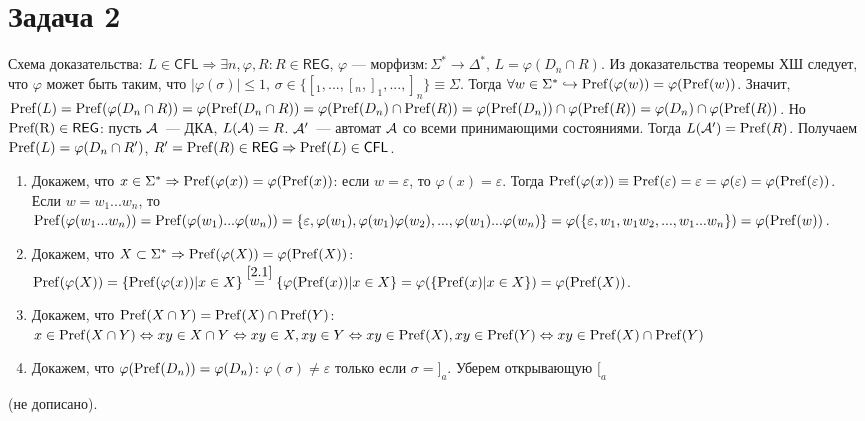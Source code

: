 \documentclass[a4paper]{article}
\def\A{{\cal A}}
\def\REG{{\mathsf{REG}}}
\def\CFL{{\mathsf{CFL}}}
\begin{document}
\section*{Задача 2}
Схема доказательства:\newline
$L\in\CFL\Rightarrow\exists n,\varphi,R\colon R\in\REG,\,\varphi\mbox{~--- морфизм}\colon \Sigma^*\longrightarrow\Delta^*,\,L=\varphi(D_n\cap R)$. Из доказательства теоремы ХШ следует, что $\varphi$ может быть таким, что $|\varphi(\sigma)|\leqslant 1,\,\sigma\in\{[_1,...,[_n,]_1,...,]_n\}\equiv\Sigma$. Тогда $\forall w\in\Sigma^*\hookrightarrow {\rm Pref}(\varphi(w))=\varphi({\rm Pref}(w))$. Значит, ${\rm Pref}(L)={\rm Pref}(\varphi(D_n\cap R))=\varphi({\rm Pref}(D_n\cap R))=\varphi({\rm Pref}(D_n)\cap{\rm Pref}(R))=\varphi({\rm Pref}(D_n))\cap\varphi({\rm Pref}(R))=\varphi(D_n)\cap\varphi({\rm Pref}(R))$. Но ${\rm Pref(R)}\in\REG$: пусть $\A$~--- ДКА, $L(\A)=R$. $\A'$~--- автомат $\A$ со всеми принимающими состояниями. Тогда $L(\A')={\rm Pref}(R)$. Получаем ${\rm Pref}(L)=\varphi(D_n\cap R')$, $R'={\rm Pref}(R)\in\REG\Rightarrow {\rm Pref}(L)\in\CFL$.
\begin{enumerate}
\item \label{2.1} Докажем, что $x\in \Sigma^*\Rightarrow {\rm Pref}(\varphi(x))=\varphi({\rm Pref}(x))$: если $w=\varepsilon$, то $\varphi(x)=\varepsilon$. Тогда ${\rm Pref}(\varphi(x))\equiv{\rm Pref}(\varepsilon)=\varepsilon=\varphi(\varepsilon)=\varphi({\rm Pref}(\varepsilon))$. Если $w=w_1...w_n$, то ${\rm Pref}(\varphi(w_1...w_n))={\rm Pref}(\varphi(w_1)...\varphi(w_n))=\{\varepsilon,\varphi(w_1),\varphi(w_1)\varphi(w_2),...,\varphi(w_1)...\varphi(w_n)\}=\varphi(\{\varepsilon,w_1,w_1w_2,...,w_1...w_n\})=\varphi({\rm Pref}(w))$.
\item Докажем, что $X\subset\Sigma^*\Rightarrow{\rm Pref}(\varphi(X))=\varphi({\rm Pref}(X))$: ${\rm Pref}(\varphi(X))=\{{\rm Pref}(\varphi(x))|x\in X\}\overset{\ref{2.1}}{=}\{\varphi({\rm Pref}(x))|x\in X\}=\varphi(\{{\rm Pref}(x)|x\in X\})=\varphi({\rm Pref}(X))$.
\item Докажем, что ${\rm Pref}(X\cap Y)={\rm Pref}(X)\cap{\rm Pref}(Y)$: $x\in {\rm Pref}(X\cap Y)\Leftrightarrow xy\in X\cap Y\Leftrightarrow xy\in X,xy\in Y\Leftrightarrow xy\in{\rm Pref}(X),xy\in {\rm Pref}(Y)\Leftrightarrow xy\in {\rm Pref}(X)\cap {\rm Pref}(Y)$
\item Докажем, что $\varphi({\rm Pref}(D_n))=\varphi(D_n)$: $\varphi(\sigma)\neq\varepsilon$ только если $\sigma=]_a$. Уберем открывающую $[_a$
\end{enumerate}
(не дописано).
\end{document}
